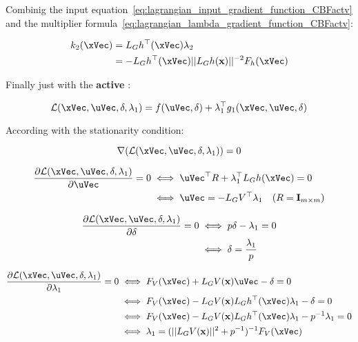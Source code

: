 Combinig the input equation~\ref{eq:lagrangian_input_gradient_function_CBFactv} and the  multiplier formula~\ref{eq:lagrangian_lambda_gradient_function_CBFactv}:

\begin{align}
    k_2(\xVec)  &= L_Gh^{\top}(\xVec) \lambda_2 \notag \\
    &= - L_Gh^{\top}(\xVec) ||L_Gh(\mathbf{x})||^{-2} F_h(\xVec) \label{eq:CBFConstraintsActvController} 
\end{align}

Finally just with the \textbf{ active} :

\begin{equation}
    \mathcal{L}(\xVec, \uVec, \delta, \lambda_1) = f(\uVec, \delta) + \lambda_1^{\top}g_1(\xVec, \uVec, \delta)
    \label{eq:lagrangian_function_CLFactv}
\end{equation}

According with the stationarity condition:

\begin{equation}
    \nabla(\mathcal{L}(\xVec, \uVec, \delta, \lambda_1)) = 0
    \label{eq:lagrangian_gradient_function_CLFactv}
\end{equation}

\begin{align}
    \frac{\partial \mathcal{L}(\xVec, \uVec, \delta, \lambda_1)}{\partial \uVec} = 0 &\iff \uVec^{\top}R + \lambda_1^{\top}L_Gh(\xVec)  = 0  \notag \\
    &\iff \uVec = -L_GV^{\top}\lambda_1 \quad ( R = \mathbf{I}_{m \times m} ) \label{eq:lagrangian_input_gradient_function_CLFactv} 
\end{align}


\begin{align}
    \frac{\partial \mathcal{L}(\xVec, \uVec, \delta, \lambda_1)}{\partial \delta} = 0 &\iff p\delta - \lambda_1 = 0 \notag \\
    &\iff \delta = \frac{\lambda_1}{p} \label{eq:lagrangian_delta_gradient_function_CLFactv}                                                                                                           
\end{align}

\begin{align}
    \frac{\partial \mathcal{L}(\xVec, \uVec, \delta, \lambda_1)}{\partial \lambda_1} = 0 &\iff  F_V(\xVec) + L_GV(\mathbf{x})\uVec - \delta = 0  \notag \\
    &\iff    F_V(\xVec) - L_GV(\mathbf{x})L_Gh^{\top}(\xVec)\lambda_1 - \delta = 0    \notag \\           
    &\iff    F_V(\xVec) - L_GV(\mathbf{x})L_Gh^{\top}(\xVec)\lambda_1 - p^{-1}\lambda_1  = 0    \notag \\                                                                                 
    &\iff    \lambda_1 = (||L_GV(\mathbf{x})||^2 + p^{-1})^{-1}F_V(\xVec) \label{eq:lagrangian_lambda_gradient_function_CLFactv}   
\end{align}


